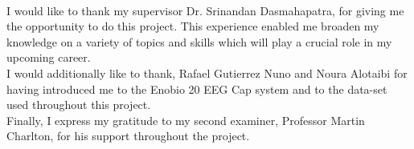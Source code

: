 

\begin{acknowledgements}
\\
I would like to thank my supervisor Dr. Srinandan Dasmahapatra, for giving me the opportunity to do this project. This experience enabled me broaden my knowledge on a variety of topics and skills which will play a crucial role in my upcoming career. \\

I would additionally like to thank, Rafael Gutierrez Nuno and Noura Alotaibi for having introduced me to the Enobio 20 EEG Cap system and to the data-set used throughout this project. \\

Finally, I express my gratitude to my second examiner, Professor Martin Charlton, for his support throughout the project. 

\end{acknowledgements}
